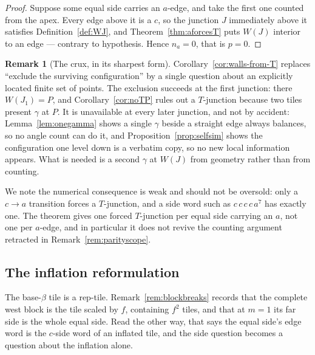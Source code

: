 \documentclass[11pt,reqno]{amsart}
\theoremstyle{plain}
\theoremstyle{definition}
\newtheorem{remark}[theorem]{Remark}
\begin{document}
\begin{proof}
Suppose some equal side carries an $a$-edge, and take the first one counted from the apex. Every edge
above it is a $c$, so the junction $J$ immediately above it satisfies Definition~\ref{def:WJ}, and
Theorem~\ref{thm:aforcesT} puts $W(J)$ interior to an edge --- contrary to hypothesis. Hence
$n_a=0$, that is $p=0$.
\end{proof}

\begin{remark}[The crux, in its sharpest form]\label{rem:cruxsharp}
Corollary~\ref{cor:walls-from-T} replaces ``exclude the surviving configuration'' by a single
question about an explicitly located finite set of points. The exclusion succeeds at the first
junction: there $W(J_1)=P$, and Corollary~\ref{cor:noTP} rules out a $T$-junction because two tiles
present $\gamma$ at $P$. It is unavailable at every later junction, and not by accident:
Lemma~\ref{lem:onegamma} shows a single $\gamma$ beside a straight edge always balances, so no angle
count can do it, and Proposition~\ref{prop:selfsim} shows the configuration one level down is a
verbatim copy, so no new local information appears. What is needed is a second $\gamma$ at $W(J)$ from
geometry rather than from counting.

We note the numerical consequence is weak and should not be oversold: only a $c\to a$ transition
forces a $T$-junction, and a side word such as $c\,c\,c\,c\,a^{7}$ has exactly one. The theorem gives
one forced $T$-junction per equal side carrying an $a$, not one per $a$-edge, and in particular it
does not revive the counting argument retracted in Remark~\ref{rem:parityscope}.
\end{remark}




\subsection{The inflation reformulation}\label{sub:inflation}

The base-$\beta$ tile is a rep-tile. Remark~\ref{rem:blockbreaks} records that the complete west block
is the tile scaled by $f$, containing $f^2$ tiles, and that at $m=1$ its far side is the whole equal
side. Read the other way, that says the equal side's edge word is the $c$-side word of an inflated
tile, and the side question becomes a question about the inflation alone.
\end{document}
